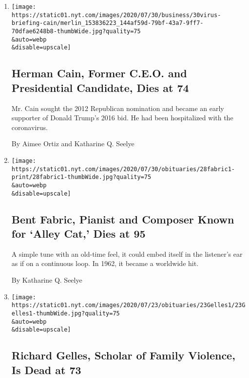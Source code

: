 \begin{enumerate}
\def\labelenumi{\arabic{enumi}.}
\item
  \href{/2020/07/30/us/politics/herman-cain-dead.html}{}

  \texttt{[image: https://static01.nyt.com/images/2020/07/30/business/30virus-briefing-cain/merlin\_153836223\_144af59d-79bf-43a7-9ff7-70dfae6248b8-thumbWide.jpg?quality=75\\\&auto=webp\\\&disable=upscale]}

  \hypertarget{herman-cain-former-ceo-and-presidential-candidate-dies-at-74}{%
  \subsection{Herman Cain, Former C.E.O. and Presidential Candidate,
  Dies at
  74}\label{herman-cain-former-ceo-and-presidential-candidate-dies-at-74}}

  Mr. Cain sought the 2012 Republican nomination and became an early
  supporter of Donald Trump's 2016 bid. He had been hospitalized with
  the coronavirus.

  By Aimee Ortiz and Katharine Q. Seelye
\item
  \href{/2020/07/29/arts/music/bent-fabric-dead.html}{}

  \texttt{[image: https://static01.nyt.com/images/2020/07/30/obituaries/28fabric1-print/28fabric1-thumbWide.jpg?quality=75\\\&auto=webp\\\&disable=upscale]}

  \hypertarget{bent-fabric-pianist-and-composer-known-for-alley-cat-dies-at-95}{%
  \subsection{Bent Fabric, Pianist and Composer Known for `Alley Cat,'
  Dies at
  95}\label{bent-fabric-pianist-and-composer-known-for-alley-cat-dies-at-95}}

  A simple tune with an old-time feel, it could embed itself in the
  listener's ear as if on a continuous loop. In 1962, it became a
  worldwide hit.

  By Katharine Q. Seelye
\item
  \href{/2020/07/25/us/richard-gelles-dead.html}{}

  \texttt{[image: https://static01.nyt.com/images/2020/07/23/obituaries/23Gelles1/23Gelles1-thumbWide.jpg?quality=75\\\&auto=webp\\\&disable=upscale]}

  \hypertarget{richard-gelles-scholar-of-family-violence-is-dead-at-73}{%
  \subsection{Richard Gelles, Scholar of Family Violence, Is Dead at
  73}\label{richard-gelles-scholar-of-family-violence-is-dead-at-73}}


\end{enumerate}
